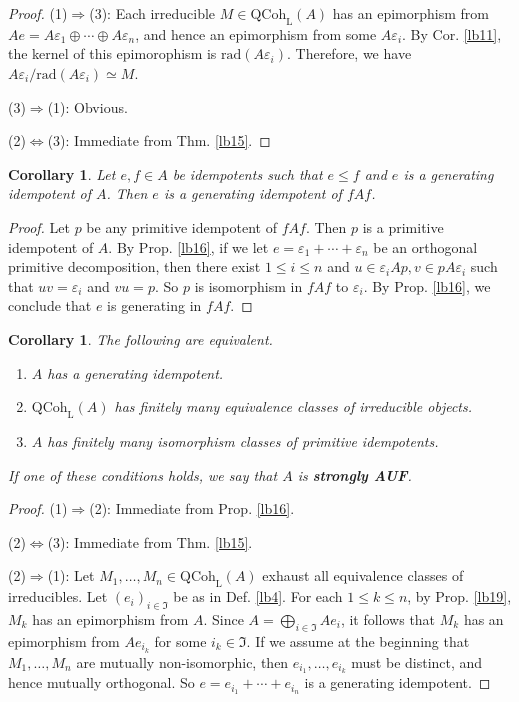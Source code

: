 \documentclass[11pt,b5paper,notitlepage]{article}
\theoremstyle{definition}
\theoremstyle{plain}
\newtheorem{co}[df]{Corollary}
\newcommand{\fk}{\mathfrak}
\newcommand{\eps}{\varepsilon}
\newcommand{\QC}{\mathrm{QCoh}_{\mathrm L}}
\newcommand{\rad}{\mathrm{rad}}
\numberwithin{equation}{section}
\begin{document}
\begin{proof}
(1)$\Rightarrow$(3): Each irreducible $M\in\QC(A)$ has an epimorphism from $Ae=A\eps_1\oplus\cdots\oplus A\eps_n$, and hence an epimorphism from some $A\eps_i$. By Cor. \ref{lb11}, the kernel of this epimorophism is $\rad(A\eps_i)$. Therefore, we have $A\eps_i/\rad(A\eps_i)\simeq M$. 

(3)$\Rightarrow$(1): Obvious.

(2)$\Leftrightarrow$(3): Immediate from Thm. \ref{lb15}.
\end{proof}


\begin{co}\label{lb59}
Let $e,f\in A$ be idempotents such that $e\leq f$ and $e$ is a generating idempotent of $A$. Then $e$ is a generating idempotent of $fAf$.
\end{co}


\begin{proof}
Let $p$ be any primitive idempotent of $fAf$. Then $p$ is a primitive idempotent of $A$. By Prop. \ref{lb16}, if we let $e=\eps_1+\cdots+\eps_n$ be an orthogonal primitive decomposition, then there exist $1\leq i\leq n$ and $u\in \eps_i A p,v\in pA\eps_i$ such that $uv=\eps_i$ and $vu=p$. So $p$ is isomorphism in $fAf$ to $\eps_i$. By Prop. \ref{lb16}, we conclude that $e$ is generating in $fAf$.
\end{proof}




\begin{co}\label{lb33}
The following are equivalent.
\begin{enumerate}[label=(\arabic*)]
\item $A$ has a generating idempotent.
\item $\QC(A)$ has finitely many equivalence classes of irreducible objects.
\item $A$ has finitely many isomorphism classes of primitive idempotents.
\end{enumerate}
If one of these conditions holds, we say that $A$ is \textbf{strongly AUF}.
\end{co}


\begin{proof}
(1)$\Rightarrow$(2): Immediate from Prop. \ref{lb16}.

(2)$\Leftrightarrow$(3): Immediate from Thm. \ref{lb15}.

(2)$\Rightarrow$(1): Let $M_1,\dots,M_n\in\QC(A)$ exhaust all equivalence classes of irreducibles. Let $(e_i)_{i\in\fk I}$ be as in Def. \ref{lb4}. For each $1\leq k\leq n$, by Prop. \ref{lb19}, $M_k$ has an epimorphism from $A$. Since $A=\bigoplus_{i\in\fk I}Ae_i$, it follows that $M_k$ has an epimorphism from $Ae_{i_k}$ for some $i_k\in\fk I$. If we assume at the beginning that $M_1,\dots,M_n$ are mutually non-isomorphic, then $e_{i_1},\dots,e_{i_k}$ must be distinct, and hence mutually orthogonal. So $e=e_{i_1}+\cdots+e_{i_n}$ is a generating idempotent.
\end{proof}
\end{document}
